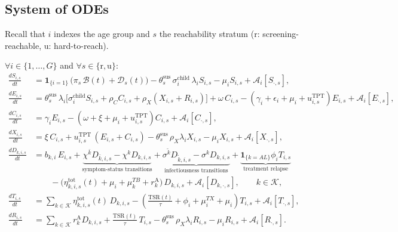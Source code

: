 \documentclass[11pt]{article}
\begin{document}
\begingroup
\footnotesize
\setlength{\abovedisplayskip}{6pt}
\setlength{\belowdisplayskip}{6pt}
\setlength{\jot}{3pt}

\subsection{System of ODEs}

Recall that \(i\) indexes the age group and \(s\) the reachability stratum (\(\mathrm{r}\): screening-reachable, \(\mathrm{u}\): hard-to-reach).

\( \forall i\in\{1,\dots,G\}\) and \(\forall s\in\{\mathrm{r},\mathrm{u}\}\):
\begin{align}
\frac{dS_{i,s}}{dt} &=
\mathbf{1}_{\{i=1\}}\,\big(\pi_s\,\mathcal{B}(t) + \mathcal{D}_s(t)\big)
- \theta^{\mathrm{sus}}_s\,\sigma^{\text{child}}_i\,\lambda_i S_{i,s}
- \mu_i S_{i,s}
+ \mathcal{A}_i[S_{\cdot,s}],
\\[3pt]
\frac{dE_{i,s}}{dt} &=
\theta^{\mathrm{sus}}_s\,\lambda_i \Big[\sigma^{\text{child}}_i S_{i,s}
+ \rho_C  C_{i,s}
+ \rho_X (X_{i,s} + R_{i,s})\Big]
+ \omega\, C_{i,s}
- \left(\gamma_i + \epsilon_i + \mu_i + u^{\mathrm{TPT}}_{i,s}\right) E_{i,s}
+ \mathcal{A}_i[E_{\cdot,s}],
\\[3pt]
\frac{dC_{i,s}}{dt} &=
\gamma_i E_{i,s}
- \left(\omega + \xi + \mu_i + u^{\mathrm{TPT}}_{i,s}\right) C_{i,s}
+ \mathcal{A}_i[C_{\cdot,s}],
\\[3pt]
\frac{dX_{i,s}}{dt} &=
\xi\, C_{i,s}
+ u^{\mathrm{TPT}}_{i,s}\,(E_{i,s} + C_{i,s})
- \theta^{\mathrm{sus}}_s\,\rho_X \lambda_i X_{i,s}
- \mu_i X_{i,s}
+ \mathcal{A}_i[X_{\cdot,s}],
\\[3pt]
\frac{dD_{k,i,s}}{dt} &=
b_{k,i}\,E_{i,s} + 
\underbrace{
 \chi^{\bar{k}} D_{\bar{k},i,s} - \chi^k D_{k,i,s} 
}_{\text{symptom-status transitions}} + 
\underbrace{
 \sigma^{\tilde{k}} D_{\tilde{k},i,s} - \sigma^k D_{k,i,s}
}_{\text{infectiousness transitions}} +
\underbrace{
\mathbf{1}_{\{k = AL\}} \phi_i T_{i,s}
}_{\text{treatment relapse}} 
\nonumber
\\
&\qquad
- \big(\eta^{\mathrm{tot}}_{k,i,s}(t) + \mu_i + \mu^{TB}_{k} + r^{\mathrm{A}}_k\big)\, D_{k,i,s}
+ \mathcal{A}_i[D_{k,\cdot,s}],
\qquad k\in\mathcal{K},
\\[3pt]
\frac{dT_{i,s}}{dt} &=
\sum_{k\in\mathcal{K}} \eta^{\mathrm{tot}}_{k,i,s}(t)\, D_{k,i,s}
- \left(\frac{\mathrm{TSR}(t)}{\tau} + \phi_i + \mu_i^{TX} + \mu_i\right) T_{i,s}
+ \mathcal{A}_i[T_{\cdot,s}],
\\[3pt]
\frac{dR_{i,s}}{dt} &=
\sum_{k\in\mathcal{K}} r^{\mathrm{A}}_k D_{k,i,s}
+ \frac{\mathrm{TSR}(t)}{\tau}\,T_{i,s}
- \theta^{\mathrm{sus}}_s\,\rho_X \lambda_i R_{i,s}
- \mu_i R_{i,s}
+ \mathcal{A}_i[R_{\cdot,s}].
\end{align}
\endgroup
\end{document}
